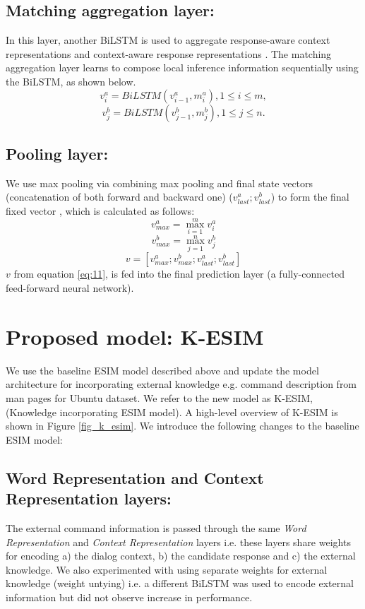 \documentclass[letterpaper]{article} %
\begin{document}
\subsection{Matching aggregation layer:}
In this layer, another BiLSTM is used to aggregate response-aware context representations and context-aware response representations \cite{chen2017enhanced}. The matching aggregation layer learns to compose local inference information sequentially using the BiLSTM, as shown below.
\begin{equation}
\label{eq:7}
v_i^a = BiLSTM(v_{i-1}^a,m_i^a), 1\leq i \leq m,
\end{equation}
\begin{equation}
\label{eq:8}
v_j^b = BiLSTM(v_{j-1}^b,m_j^b), 1\leq j \leq n.
\end{equation}
\subsection{Pooling layer:}
We use max pooling via combining max pooling and final state vectors (concatenation of both forward and backward one) ($v_{last}^a ; v_{last}^b$) to form the final fixed vector \cite{dong2018enhance}, which is calculated as follows:
\begin{equation}
\label{eq:9}
v_{max}^a = \max_{i=1}^m v_i^a
\end{equation}
\begin{equation}
\label{eq:10}
v_{max}^b = \max_{j=1}^n v_j^b
\end{equation}
\begin{equation}
\label{eq:11}
v = [v_{max}^a;v_{max}^b;v_{last}^a;v_{last}^b]
\end{equation}
$v$ from equation \ref{eq:11}, is fed into the final prediction layer (a fully-connected feed-forward neural network).

\section{Proposed model: K-ESIM}
\label{proposed-model-k-esim}
We use the baseline ESIM model described above and update the model architecture for incorporating external knowledge e.g. command description from man pages for Ubuntu dataset. We refer to the new model as K-ESIM, (Knowledge incorporating ESIM model). A high-level overview of K-ESIM is shown in Figure \ref{fig_k_esim}. We introduce the following changes to the baseline ESIM model:

\subsection{Word Representation and Context Representation layers:}
The external command information is passed through the same \textit{Word Representation} and \textit{Context Representation} layers i.e. these layers share weights for encoding a) the dialog context, b) the candidate response and c) the external knowledge. We also experimented with using separate weights for external knowledge (weight untying) i.e. a different BiLSTM was used to encode external information but did not observe increase in performance.
\end{document}

